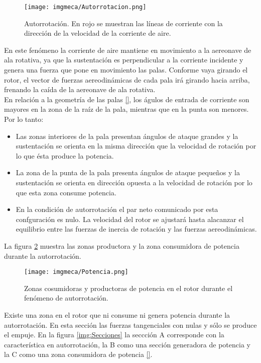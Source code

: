 \begin{figure}[H]
	\centering
		\texttt{[image: imgmeca/Autorrotacion.png]}
	\caption{Autorrotaci\'on. En rojo se muestran las l\'ineas de corriente con la direcci\'on de la velocidad de la corriente de aire.}
	\label{img:Autorrotacion}
\end{figure}


\noindent En este fen\'omeno la corriente de aire mantiene en movimiento a la aereonave de ala rotativa, ya que la sustentaci\'on es perpendicular a la corriente incidente y genera una fuerza que pone en movimiento las palas. Conforme vaya girando el rotor, el vector de fuerzas aereodin\'amicas de cada pala ir\'a girando hacia arriba, frenando la ca\'ida de la aereonave de ala rotativa.\\

En relaci\'on a la geometr\'ia de las palas \ref{}, los \'agulos de entrada de corriente son mayores en la zona de la ra\'iz de la pala, mientras que en  la punta son menores. Por lo tanto:

\begin{itemize}
\item Las zonas interiores de la pala presentan \'angulos de ataque grandes y la sustentaci\'on se orienta en la misma direcci\'on que la velocidad de rotaci\'on por lo que \'esta produce la potencia.
\item La zona de la punta de la pala presenta \'angulos de ataque peque\~{n}os y la sustentaci\'on se orienta en direcci\'on opuesta a la velocidad de rotaci\'on por lo que esta zona consume potencia.
\item En la condici\'on de autorrotaci\'on el par neto comunicado por esta confguraci\'on es nulo. La velocidad del rotor se ajustar\'a hasta alacanzar el equilibrio entre las fuerzas de inercia de rotaci\'on y las fuerzas aereodin\'amicas.
\end{itemize}
 
La figura \ref{img:Potencia} muestra las zonas productora y la zona consumidora de potencia durante la autorrotaci\'on.

\begin{figure}[H]
	\centering
	\texttt{[image: imgmeca/Potencia.png]}
	\caption{Zonas cosumidoras y productoras de potencia en el rotor durante el fen\'omeno de autorrotaci\'on.}
	\label{img:Potencia}
\end{figure}

\noindent Existe una zona en el rotor que ni consume ni genera potencia durante la autorrotaci\'on. En esta secci\'on las fuerzas tangenciales con nulas y s\'olo se produce el empuje. En la figura \ref{img:Secciones} la seccci\'on A corresponde con la caracter\'istica en autorrotaci\'on, la B como una secci\'on generadora de potencia y la C como una zona consumidora de potencia \ref{}.

